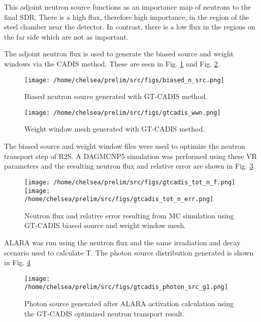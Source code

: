 This adjoint neutron source functions as an importance map of neutrons to the
final SDR.  There is a high flux, therefore high importance, in the region of the 
steel chamber near the detector.
In contrast, there is a low flux in the regions on the
far side which are not as important.

The adjoint neutron flux is used to generate the biased source and weight
windows via the CADIS method.  These are seen in Fig. \ref{fig:ex.biased_src} and
Fig. \ref{fig:ex.wwinp}.

\begin{figure} 
	\texttt{[image: /home/chelsea/prelim/src/figs/biased\_n\_src.png]}
	\caption [GT-CADIS biased neutron source] 
	{Biased neutron source generated with GT-CADIS method.\label{fig:ex.biased_src}}
\end{figure}

\begin{figure} 
	\texttt{[image: /home/chelsea/prelim/src/figs/gtcadis\_wwn.png]}
	\caption [GT-CADIS weight window mesh]
	{Weight window mesh generated with GT-CADIS method.\label{fig:ex.wwinp}}
\end{figure}

The biased source and weight window files were used to optimize the neutron
transport step of R2S.  A DAGMCNP5 simulation was performed using these VR
parameters and the resulting neutron flux and relative error are shown in Fig.
\ref{fig:ex.gt_nflux}.

\begin{figure} 
	\texttt{[image: /home/chelsea/prelim/src/figs/gtcadis\_tot\_n\_f.png]}
	\texttt{[image: /home/chelsea/prelim/src/figs/gtcadis\_tot\_n\_err.png]}
	\caption [GT-CADIS neutron flux and relative error] 
	{Neutron flux and relative error resulting from MC simulation using
	 GT-CADIS biased source and weight window mesh.\label{fig:ex.gt_nflux}}
\end{figure}

ALARA was run using the neutron flux and the same irradiation and decay scenario used to calculate
T.  The photon source distribution generated is shown in Fig. \ref{fig:ex.gt_psrc}

\begin{figure} 
	\texttt{[image: /home/chelsea/prelim/src/figs/gtcadis\_photon\_src\_g1.png]}
	\caption [GT-CADIS photon source]
	{Photon source generated after ALARA activation calculation using the
	GT-CADIS optimized neutron transport result.\label{fig:ex.gt_psrc}}
\end{figure}

